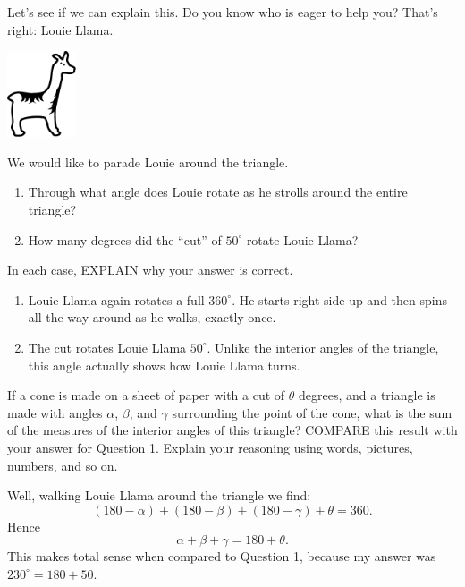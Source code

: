 \documentclass[nooutcomes,noauthor,handout,12pt]{ximera}
\begin{document}
\begin{question}
  Let's see if we can explain this. Do you know who is eager to help
you? That's right: Louie Llama.
\begin{center}
\includegraphics[height=1in]{llama.pdf}
\end{center}

We would like to parade Louie around the triangle.
\begin{enumerate}
\item Through what angle does Louie rotate as he strolls around the
  entire triangle?
\item How many degrees did the ``cut'' of $50^\circ$ rotate Louie
  Llama?
\end{enumerate}
In each case, EXPLAIN why your answer is correct. 
\begin{freeResponse}
  \begin{enumerate}
  \item Louie Llama again rotates a full $360^\circ$. He starts
    right-side-up and then spins all the way around as he walks,
    exactly once.
  \item The cut rotates Louie Llama $50^\circ$. Unlike the interior
    angles of the triangle, this angle actually shows how Louie Llama
    turns.
  \end{enumerate}
\end{freeResponse}
\end{question}

\mynewpage


\begin{question}
If a cone is made on a sheet of paper with a cut of $\theta$ degrees,
and a triangle is made with angles $\alpha$, $\beta$, and $\gamma$
surrounding the point of the cone, what is the sum of the measures of
the interior angles of this triangle? COMPARE this result with your
answer for Question 1. Explain your reasoning using words, pictures,
numbers, and so on.
\begin{freeResponse}
  Well, walking Louie Llama around the triangle we find:
  \[
  (180-\alpha) + (180-\beta) + (180-\gamma) + \theta = 360.
  \]
  Hence
  \[
  \alpha + \beta + \gamma = 180 + \theta.
  \]
  This makes total sense when compared to Question 1, because my
  answer was $230^\circ = 180+50$.
\end{freeResponse}
\end{question}
\end{document}
